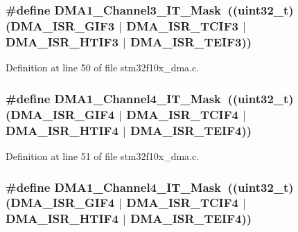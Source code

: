 \subsubsection[{\texorpdfstring{D\+M\+A1\+\_\+\+Channel3\+\_\+\+I\+T\+\_\+\+Mask}{DMA1_Channel3_IT_Mask}}]{\setlength{\rightskip}{0pt plus 5cm}\#define D\+M\+A1\+\_\+\+Channel3\+\_\+\+I\+T\+\_\+\+Mask~(({\bf uint32\+\_\+t})({\bf D\+M\+A\+\_\+\+I\+S\+R\+\_\+\+G\+I\+F3} $\vert$ {\bf D\+M\+A\+\_\+\+I\+S\+R\+\_\+\+T\+C\+I\+F3} $\vert$ {\bf D\+M\+A\+\_\+\+I\+S\+R\+\_\+\+H\+T\+I\+F3} $\vert$ {\bf D\+M\+A\+\_\+\+I\+S\+R\+\_\+\+T\+E\+I\+F3}))}\hypertarget{group___d_m_a___private___defines_gabbe4f28c48dc0c3b678cbf4a4fd79e54}{}\label{group___d_m_a___private___defines_gabbe4f28c48dc0c3b678cbf4a4fd79e54}


Definition at line 50 of file stm32f10x\+\_\+dma.\+c.

\subsubsection[{\texorpdfstring{D\+M\+A1\+\_\+\+Channel4\+\_\+\+I\+T\+\_\+\+Mask}{DMA1_Channel4_IT_Mask}}]{\setlength{\rightskip}{0pt plus 5cm}\#define D\+M\+A1\+\_\+\+Channel4\+\_\+\+I\+T\+\_\+\+Mask~(({\bf uint32\+\_\+t})({\bf D\+M\+A\+\_\+\+I\+S\+R\+\_\+\+G\+I\+F4} $\vert$ {\bf D\+M\+A\+\_\+\+I\+S\+R\+\_\+\+T\+C\+I\+F4} $\vert$ {\bf D\+M\+A\+\_\+\+I\+S\+R\+\_\+\+H\+T\+I\+F4} $\vert$ {\bf D\+M\+A\+\_\+\+I\+S\+R\+\_\+\+T\+E\+I\+F4}))}\hypertarget{group___d_m_a___private___defines_ga6b67cd69dbebc4d39a13b3d863a4122b}{}\label{group___d_m_a___private___defines_ga6b67cd69dbebc4d39a13b3d863a4122b}


Definition at line 51 of file stm32f10x\+\_\+dma.\+c.

\subsubsection[{\texorpdfstring{D\+M\+A1\+\_\+\+Channel4\+\_\+\+I\+T\+\_\+\+Mask}{DMA1_Channel4_IT_Mask}}]{\setlength{\rightskip}{0pt plus 5cm}\#define D\+M\+A1\+\_\+\+Channel4\+\_\+\+I\+T\+\_\+\+Mask~(({\bf uint32\+\_\+t})({\bf D\+M\+A\+\_\+\+I\+S\+R\+\_\+\+G\+I\+F4} $\vert$ {\bf D\+M\+A\+\_\+\+I\+S\+R\+\_\+\+T\+C\+I\+F4} $\vert$ {\bf D\+M\+A\+\_\+\+I\+S\+R\+\_\+\+H\+T\+I\+F4} $\vert$ {\bf D\+M\+A\+\_\+\+I\+S\+R\+\_\+\+T\+E\+I\+F4}))}\hypertarget{group___d_m_a___private___defines_ga6b67cd69dbebc4d39a13b3d863a4122b}{}\label{group___d_m_a___private___defines_ga6b67cd69dbebc4d39a13b3d863a4122b}


